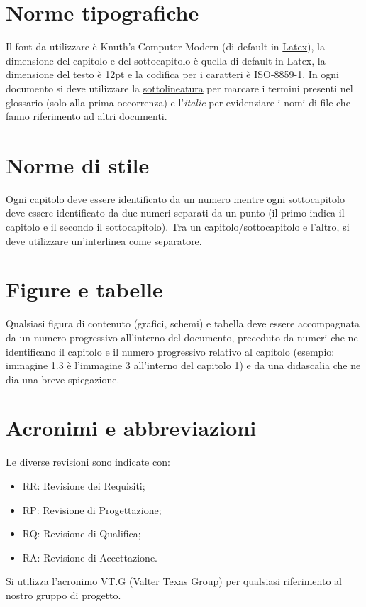 \section{Norme tipografiche}
Il font da utilizzare \`e Knuth's Computer Modern (di default in
\underline{Latex}), la dimensione del capitolo e del sottocapitolo \`e quella di
default in Latex, la dimensione del testo \`e 12pt e la codifica per i caratteri
\`e ISO-8859-1. In ogni documento si deve utilizzare la \underline{sottolineatura} per marcare i termini presenti nel glossario (solo
alla prima occorrenza) e l'\emph{italic} per evidenziare i nomi di file che
fanno riferimento ad altri documenti.

\section{Norme di stile}
Ogni capitolo deve essere identificato da un numero mentre ogni sottocapitolo
deve essere identificato da due numeri separati da un punto (il primo indica il
capitolo e il secondo il sottocapitolo). Tra un capitolo/sottocapitolo e
l'altro, si deve utilizzare un'interlinea come separatore.

\section{Figure e tabelle}
Qualsiasi figura di contenuto (grafici, schemi) e tabella deve essere
accompagnata da un numero progressivo all'interno del documento, preceduto da
numeri che ne identificano il capitolo e il numero progressivo relativo al capitolo (esempio: immagine 1.3
\`e l'immagine 3 all'interno del capitolo 1) e da una
didascalia che ne dia una breve spiegazione.

\section{Acronimi e abbreviazioni}
Le diverse revisioni sono indicate con:
\begin{itemize}
\item {RR: Revisione dei Requisiti;}
\item {RP: Revisione di Progettazione; }
\item {RQ: Revisione di Qualifica;}
\item {RA: Revisione di Accettazione.}
\end{itemize}
Si utilizza l'acronimo VT.G (Valter Texas Group) per qualsiasi riferimento al
nostro gruppo di progetto.



